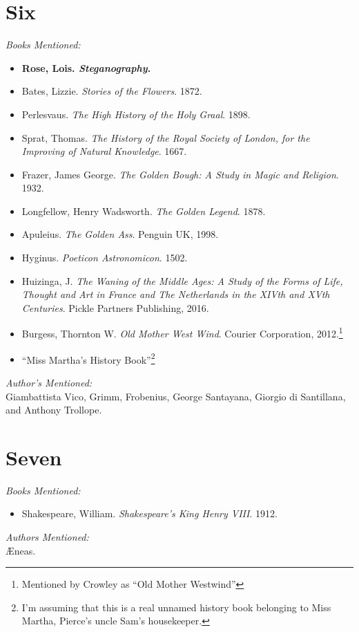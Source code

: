 \documentclass[twoside,10pt]{report}
\begin{document}
\section{Six}
\textit{Books Mentioned:}
\begin{itemize}
\item \textbf{Rose, Lois. \textit{Steganography}.}
\item Bates, Lizzie. \textit{Stories of the Flowers}. 1872.\cite{Bates1872}
\item Perlesvaus. \textit{The High History of the Holy Graal}. 1898.\cite{Perlesvaus1898}
\item Sprat, Thomas. \textit{The History of the Royal Society of London, for the Improving of
Natural Knowledge}. 1667.\cite{Sprat1667}
\item Frazer, James George. \textit{The Golden Bough: A Study in Magic and Religion}. 1932.\cite{Frazer1932}
\item Longfellow, Henry Wadsworth. \textit{The Golden Legend}. 1878.\cite{Longfellow}
\item Apuleius. \textit{The Golden Ass}. Penguin UK, 1998.\cite{Apuleius1998}
\item Hyginus. \textit{Poeticon Astronomicon}. 1502.\cite{Hyginus}
\item Huizinga, J. \textit{The Waning of the Middle Ages: A Study of the Forms of Life, Thought and Art in France and The Netherlands in the XIVth and XVth Centuries}. Pickle Partners Publishing, 2016.\cite{Huizinga2016}
\item Burgess, Thornton W. \textit{Old Mother West Wind}. Courier Corporation, 2012.\cite{Burgess2012}\footnote{Mentioned by Crowley as “Old Mother Westwind”}
\item “Miss Martha’s History Book”\footnote{I’m assuming that this is a real unnamed history book belonging to Miss Martha, Pierce’s uncle Sam’s housekeeper.}
\end{itemize}
\textit{Author's Mentioned:}\\
Giambattista Vico, Grimm, Frobenius, George Santayana, Giorgio di Santillana, and Anthony Trollope.

\section{Seven}
\textit{Books Mentioned:}
\begin{itemize}
\item Shakespeare, William. \textit{Shakespeare’s King Henry VIII}. 1912.\cite{Shakespeare1912}
\end{itemize}
\textit{Authors Mentioned:}\\
Æneas.
\end{document}

